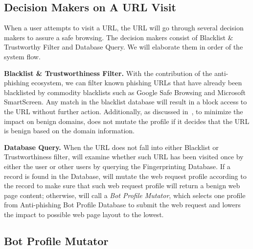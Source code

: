\subsection{Decision Makers on A URL Visit}

When a user attempts to visit a URL, the URL will go through several decision makers to assure a safe browsing.
The decision makers consist of Blacklist \& Trustworthy Filter and Database Query.
We will elaborate them in order of the system flow.

\noindent
\textbf{Blacklist \& Trustworthiness Filter.}
With the contribution of the anti-phishing ecosystem, we can filter known phishing URLs that have already been blacklisted by commodity blacklists such as Google Safe Browsing and Microsoft SmartScreen.
Any match in the blacklist database will result in a block access to the URL without further action.
Additionally, as discussed in~, to minimize the impact on benign domains, \spartacus does not mutate the profile if it decides that the URL is benign based on the domain information.


\noindent
\textbf{Database Query.}
When the URL does not fall into either Blacklist or Trustworthiness filter, \spartacus will examine whether such URL has been visited once by either the user or other users by querying the Fingerprinting Database.
If a record is found in the Database, \spartacus will mutate the web request profile according to the record to make sure that such web request profile will return a benign web page content;
otherwise, \spartacus will call a \emph{Bot Profile Mutator}, which selects one profile from Anti-phishing Bot Profile Database to submit the web request and lowers the impact to possible web page layout to the lowest.



\subsection{Bot Profile Mutator}

